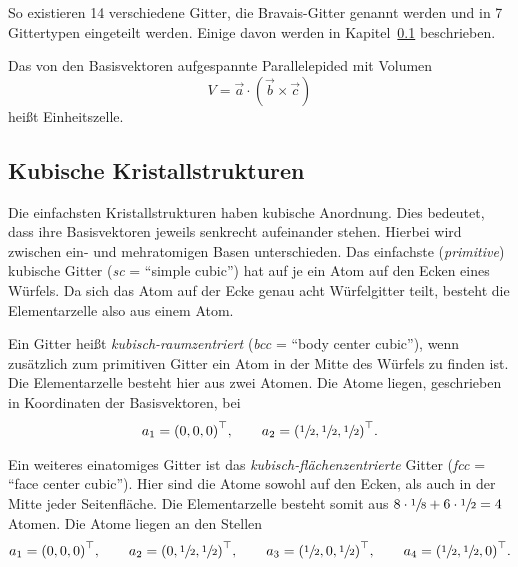 So existieren 14 verschiedene Gitter, die Bravais-Gitter genannt werden
und in 7 Gittertypen eingeteilt werden.
Einige davon werden in Kapitel~\ref{sub:kubische_kristallstrukturen} beschrieben.

Das von den Basisvektoren aufgespannte Parallelepided mit Volumen
\begin{equation}
  V = \vec{a} \cdot \left(\vec{b} \times \vec{c}\right)
\end{equation}
heißt Einheitszelle.


\subsection{Kubische Kristallstrukturen}%
\label{sub:kubische_kristallstrukturen}
Die einfachsten Kristallstrukturen haben kubische Anordnung.
Dies bedeutet, dass ihre Basisvektoren jeweils senkrecht aufeinander stehen.
Hierbei wird zwischen ein- und mehratomigen Basen unterschieden.
Das einfachste (\textit{primitive}) kubische Gitter (\textit{sc} = \enquote{simple cubic}) hat auf je ein Atom auf den Ecken eines Würfels.
Da sich das Atom auf der Ecke genau acht Würfelgitter teilt,
besteht die Elementarzelle also aus einem Atom.

Ein Gitter heißt \textit{kubisch-raumzentriert} (\textit{bcc} = \enquote{body center cubic}), wenn zusätzlich zum primitiven Gitter
ein Atom in der Mitte des Würfels zu finden ist.
Die Elementarzelle besteht hier aus zwei Atomen.
Die Atome liegen, geschrieben in Koordinaten der Basisvektoren, bei
\begin{align*}
  a_1 = {\left(0, 0, 0\right)}^\top, \hspace{2em} a_2 = {\left(\sfrac{1}{2}, \sfrac{1}{2}, \sfrac{1}{2}\right)}^\top.
\end{align*}

Ein weiteres einatomiges Gitter ist das \textit{kubisch-flächenzentrierte} Gitter (\textit{fcc} = \enquote{face center cubic}).
Hier sind die Atome sowohl auf den Ecken, als auch in der Mitte jeder Seitenfläche.
Die Elementarzelle besteht somit aus $8 \cdot \sfrac{1}{8} + 6 \cdot \sfrac{1}{2} = 4$ Atomen.
Die Atome liegen an den Stellen
\begin{align*}
  a_1 = {\left(0, 0, 0\right)}^\top, \hspace{2em}
  a_2 = {\left(0, \sfrac{1}{2}, \sfrac{1}{2}\right)}^\top, \hspace{2em}
  a_3 = {\left(\sfrac{1}{2}, 0, \sfrac{1}{2}\right)}^\top, \hspace{2em}
  a_4 = {\left(\sfrac{1}{2}, \sfrac{1}{2}, 0\right)}^\top.
\end{align*}

